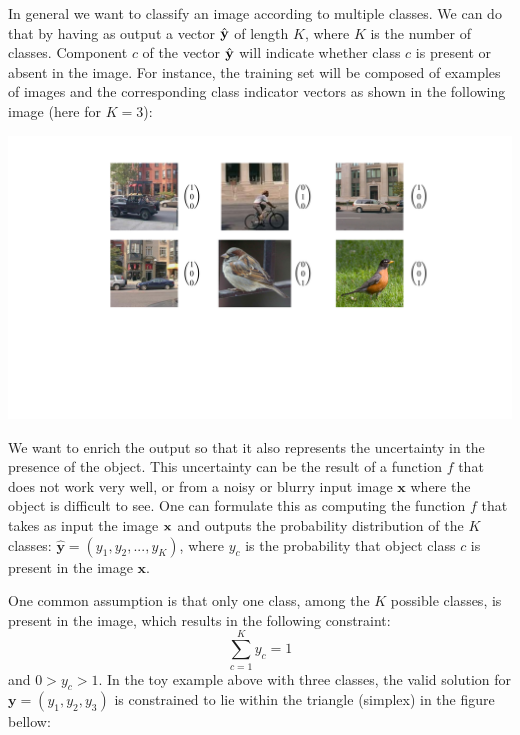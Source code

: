 In general we want to classify an image according to multiple classes. We can do that by having as output a vector $\hat {\bf y}$ of length $K$, where $K$ is the number of classes. Component $c$ of the vector $\hat {\bf y}$ will indicate whether class $c$ is present or absent in the image. For instance, the training set will be composed of examples of images and the corresponding class indicator vectors as shown in the following image (here for $K=3$):

\includegraphics[width=1\linewidth]{figures/object_recognition/classification_training_set.pdf}

We want to enrich the output so that it also represents the uncertainty in the presence of the object. This uncertainty can be the result of a function $f$ that does not work very well, or from a noisy or blurry input image $\mathbf{x}$ where the object is difficult to see. One can formulate this as computing the function $f$ that takes as input the image ${\bf x}$ and outputs the probability distribution of the $K$ classes: $\hat{\mathbf{y}}=(y_1, y_2, ..., y_K)$, where $y_c$ is the probability that object class $c$ is present in the image $\mathbf{x}$.

One common assumption is that only one class, among the $K$ possible classes, is present in the image, which results in the following constraint:
\begin{equation}
	\sum_{c=1}^K y_c=1
\end{equation}
and $0>y_c>1$.
In the toy example above with three classes, the valid solution for $\mathbf{y}=(y_1, y_2, y_3)$ is constrained to lie within the triangle (simplex) in the figure bellow:



